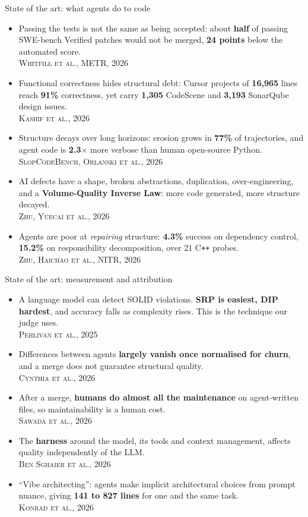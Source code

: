 \documentclass[11pt,aspectratio=169]{beamer}
\newcommand{\finding}[2]{#1\\[2pt]{\scriptsize\color{accentgray}\textsc{#2}}}
\begin{document}
\begin{frame}{State of the art: what agents do to code}
\footnotesize
\begin{itemize}\setlength{\itemsep}{5pt}
  \item \finding{Passing the tests is not the same as being accepted: about \textbf{half} of
        passing SWE-bench Verified patches would not be merged, \textbf{24 points} below the
        automated score.}{Whitfill et al., METR, 2026}
  \item \finding{Functional correctness hides structural debt: Cursor projects of
        \textbf{16{,}965} lines reach \textbf{91\%} correctness, yet carry \textbf{1{,}305}
        CodeScene and \textbf{3{,}193} SonarQube design issues.}{Kashif et al., 2026}
  \item \finding{Structure decays over long horizons: erosion grows in \textbf{77\%} of
        trajectories, and agent code is \textbf{2.3$\times$} more verbose than human open-source
        Python.}{SlopCodeBench, Orlanski et al., 2026}
  \item \finding{AI defects have a shape, broken abstractions, duplication, over-engineering, and a
        \textbf{Volume-Quality Inverse Law}: more code generated, more structure
        decayed.}{Zhu, Yuecai et al., 2026}
  \item \finding{Agents are poor at \emph{repairing} structure: \textbf{4.3\%} success on dependency
        control, \textbf{15.2\%} on responsibility decomposition, over 21 C\texttt{++}
        probes.}{Zhu, Haichao et al., NITR, 2026}
\end{itemize}
\end{frame}

\begin{frame}{State of the art: measurement and attribution}
\footnotesize
\begin{itemize}\setlength{\itemsep}{5pt}
  \item \finding{A language model can detect SOLID violations. \textbf{SRP is easiest, DIP
        hardest}, and accuracy falls as complexity rises. This is the technique our judge
        uses.}{Pehlivan et al., 2025}
  \item \finding{Differences between agents \textbf{largely vanish once normalised for churn}, and
        a merge does not guarantee structural quality.}{Cynthia et al., 2026}
  \item \finding{After a merge, \textbf{humans do almost all the maintenance} on agent-written
        files, so maintainability is a human cost.}{Sawada et al., 2026}
  \item \finding{The \textbf{harness} around the model, its tools and context management, affects
        quality independently of the LLM.}{Ben Sghaier et al., 2026}
  \item \finding{``Vibe architecting'': agents make implicit architectural choices from prompt
        nuance, giving \textbf{141 to 827 lines} for one and the same task.}{Konrad et al., 2026}
\end{itemize}
\end{frame}
\end{document}
